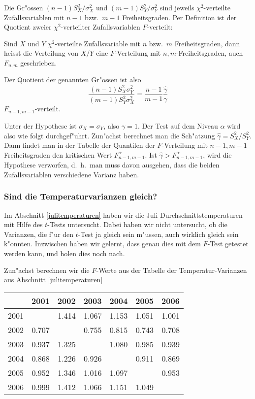 Die Gr"ossen $(n-1)S_X^2/\sigma_X^2$ und $(m-1)S_Y^2/\sigma_Y^2$ sind jeweils
$\chi^2$-verteilte Zufallsvariablen mit $n-1$ bzw.~$m-1$ Freiheitsgraden.
Per Definition ist der Quotient zweier $\chi^2$-verteilter Zufallsvariablen
$F$-verteilt:
\begin{definition}
Sind $X$ und $Y$ $\chi^2$-verteilte Zufallsvariable mit $n$ bzw.~$m$
Freiheitsgraden, dann heisst die Verteilung von $X/Y$ eine $F$-Verteilung
mit $n,m$-Freiheitsgraden, auch $F_{n,m}$ geschrieben.
\end{definition}
Der Quotient der genannten Gr"ossen ist also
\begin{equation}
\frac{(n-1)S_X^2\sigma_Y^2}{(m-1)S_Y^2\sigma_X^2}
=\frac{n-1}{m-1}\frac{\hat\gamma}{\gamma}
\end{equation}
$F_{n-1,m-1}$-verteilt.

Unter der Hypothese ist $\sigma_X=\sigma_Y$, also $\gamma=1$.
Der Test auf dem Niveau $\alpha$ wird also wie folgt durchgef"uhrt.
Zun"achst berechnet man die Sch"atzung $\hat\gamma=S_X^2/S_Y^2$.
Dann
findet man in der Tabelle der Quantilen der $F$-Verteilung mit $n-1,m-1$
Freiheitsgraden den kritischen Wert $F_{n-1,m-1}^\alpha$.
Ist $\hat\gamma>F_{n-1,m-1}^\alpha$, wird die Hypothese verworfen,
d.~h.~man muss davon ausgehen, dass die beiden Zufallsvariablen verschiedene
Varianz haben.

\subsubsection{Sind die Temperaturvarianzen gleich?}
Im Abschnitt \ref{julitemperaturen} haben wir die
Juli-Durchschnittstemperaturen mit Hilfe des $t$-Tests untersucht.
Dabei haben wir nicht untersucht, ob die Varianzen, die f"ur den
$t$-Test ja gleich sein m"ussen, auch wirklich gleich sein k"onnten.
Inzwischen haben wir gelernt, dass genau dies mit dem $F$-Test getestet
werden kann, und holen dies noch nach.

Zun"achst berechnen wir die $F$-Werte aus der Tabelle der Temperatur-Varianzen
aus Abschnitt \ref{julitemperaturen}

\begin{center}
\begin{tabular}{|r|rrrrrr|}
\hline
    &  2001&  2002&  2003&  2004&  2005&  2006\\
\hline
2001&      & 1.414& 1.067& 1.153& 1.051& 1.001\\
2002& 0.707&      & 0.755& 0.815& 0.743& 0.708\\
2003& 0.937& 1.325&      & 1.080& 0.985& 0.939\\
2004& 0.868& 1.226& 0.926&      & 0.911& 0.869\\
2005& 0.952& 1.346& 1.016& 1.097&      & 0.953\\
2006& 0.999& 1.412& 1.066& 1.151& 1.049&      \\
\hline
\end{tabular}
\end{center}

